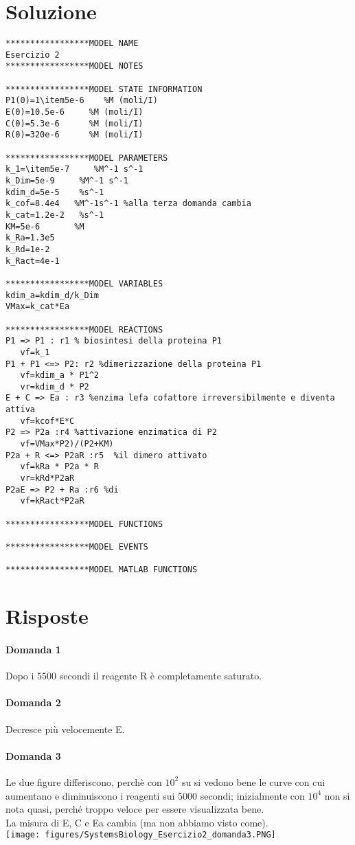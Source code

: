 \documentclass{article}
\begin{document}
\section*{Soluzione}
\begin{verbatim}
*****************MODEL NAME
Esercizio 2
*****************MODEL NOTES

*****************MODEL STATE INFORMATION
P1(0)=1\item5e-6    %M (moli/I)
E(0)=10.5e-6     %M (moli/I)
C(0)=5.3e-6      %M (moli/I)
R(0)=320e-6      %M (moli/I)

*****************MODEL PARAMETERS
k_1=\item5e-7     %M^-1 s^-1
k_Dim=5e-9     %M^-1 s^-1
kdim_d=5e-5    %s^-1
k_cof=8.4e4   %M^-1s^-1 %alla terza domanda cambia 
k_cat=1.2e-2   %s^-1
KM=5e-6       %M
k_Ra=1.3e5
k_Rd=1e-2
k_Ract=4e-1

*****************MODEL VARIABLES
kdim_a=kdim_d/k_Dim
VMax=k_cat*Ea

*****************MODEL REACTIONS
P1 => P1 : r1 % biosintesi della proteina P1
   vf=k_1
P1 + P1 <=> P2: r2 %dimerizzazione della proteina P1
   vf=kdim_a * P1^2
   vr=kdim_d * P2
E + C => Ea : r3 %enzima lefa cofattore irreversibilmente e diventa attiva
   vf=kcof*E*C
P2 => P2a :r4 %attivazione enzimatica di P2 
   vf=VMax*P2)/(P2+KM)
P2a + R <=> P2aR :r5  %il dimero attivato 
   vf=kRa * P2a * R
   vr=kRd*P2aR
P2aE => P2 + Ra :r6 %di
   vf=kRact*P2aR

*****************MODEL FUNCTIONS

*****************MODEL EVENTS

*****************MODEL MATLAB FUNCTIONS
\end{verbatim}

\section*{Risposte}
\paragraph{Domanda 1}
Dopo i $5500$ secondi il reagente R è completamente saturato.
\paragraph{Domanda 2}
Decresce più velocemente E.
\paragraph{Domanda 3}
Le due figure differiscono, perchè con $10^2$ su si vedono bene le curve con cui aumentano e diminuiscono i reagenti sui 5000 secondi; 
inizialmente con $10^4$ non si nota quasi, perché troppo veloce per essere visualizzata bene.\\
La misura di E, C e Ea cambia (ma non abbiamo visto come).\\
\texttt{[image: figures/SystemsBiology\_Esercizio2\_domanda3.PNG]}
\end{document}
